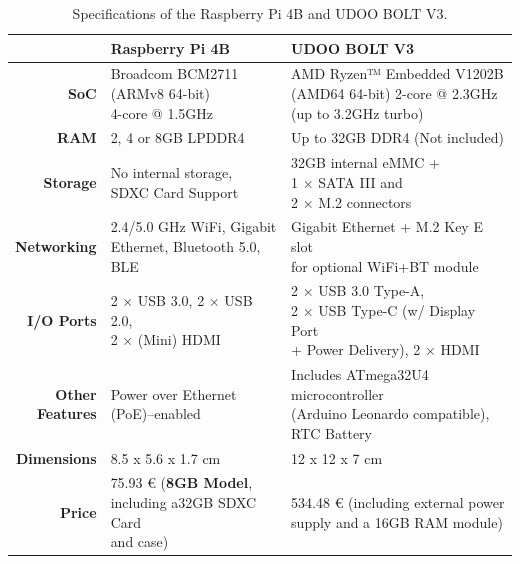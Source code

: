 \renewcommand{\arraystretch}{2.5}
\begin{table}[H]
    \centering
    \begin{tabular}{r|l|l}
        & \textbf{Raspberry Pi 4B}& \textbf{UDOO BOLT V3}  \\ \hline
        \textbf{SoC} &  \makecell{Broadcom BCM2711 \\ (ARMv8 64-bit) \\ 4-core @ 1.5GHz} & \makecell{AMD Ryzen™ Embedded V1202B \\ (AMD64 64-bit) 2-core @ 2.3GHz \\ (up to 3.2GHz turbo)}\\
        \textbf{RAM} & 2, 4 or 8GB LPDDR4 & Up to 32GB DDR4 (Not included) \\ 
        \textbf{Storage} & \makecell{No internal storage, \\ SDXC Card Support} & \makecell{32GB internal eMMC + \\1 × SATA III and \\ 2 × M.2 connectors}\\
        \textbf{Networking} & \makecell{2.4/5.0 GHz WiFi, Gigabit \\ Ethernet, Bluetooth 5.0, BLE} & \makecell{Gigabit Ethernet + M.2 Key E slot \\ for optional WiFi+BT module}\\ 
        \textbf{I/O Ports} & \makecell{ 2 × USB 3.0, 2 × USB 2.0, \\ 2 × (Mini) HDMI} & \makecell{2 × USB 3.0 Type-A, \\ 2 × USB Type-C (w/ Display Port \\ + Power Delivery), 2 × HDMI} \\
        \makecell[r]{\textbf{Other} \\\textbf{Features}} & \makecell{Power over Ethernet \\(PoE)–enabled} & \makecell{Includes ATmega32U4 microcontroller\\ (Arduino Leonardo compatible), \\ RTC Battery} \\   
        \textbf{Dimensions} & 8.5 x 5.6 x 1.7 cm & 12 x 12 x 7 cm \\
        \textbf{Price} & \makecell{75.93 € (\textbf{8GB Model}, \\ including a32GB SDXC Card\\ and case)} & \makecell{534.48 € (including external power \\ supply and a 16GB RAM module)} \\
    \end{tabular}
    \caption{Specifications of the Raspberry Pi 4B and UDOO BOLT V3.}
    \label{tab:comparsion-hardwareplatform}
\end{table}
\renewcommand{\arraystretch}{1}


